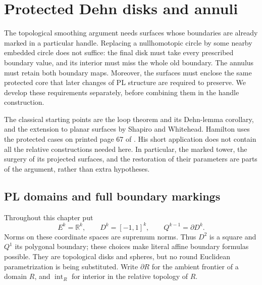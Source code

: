 \chapter{Protected Dehn disks and annuli}
\label{ch:dehn-surfaces}

The topological smoothing argument needs surfaces whose boundaries are
already marked in a particular handle.  Replacing a nullhomotopic circle
by some nearby embedded circle does not suffice: the final disk must take
every prescribed boundary value, and its interior must miss the whole old
boundary.  The annulus must retain both boundary maps.  Moreover, the
surfaces must enclose the same protected core that later changes of PL
structure are required to preserve.  We develop these requirements
separately, before combining them in the handle construction.

The classical starting points are the loop theorem and its Dehn-lemma
corollary, and the extension to planar surfaces by Shapiro and Whitehead.
Hamilton uses the protected cases on printed page 67 of
\cite{Hamilton1976}.  His short application does not contain all the
relative constructions needed here.  In particular, the marked tower,
the surgery of its projected surfaces, and the restoration of their
parameters are parts of the argument, rather than extra hypotheses.

\section{PL domains and full boundary markings}
\label{sec:dehn-domains}

Throughout this chapter put
\[
 E^k=\mathbb R^k,\qquad
 D^k=[-1,1]^k,\qquad Q^{k-1}=\partial D^k.
\]
Norms on these coordinate spaces are supremum norms.  Thus $D^2$ is a
square and $Q^1$ its polygonal boundary; these choices make literal
affine boundary formulas possible.  They are topological disks and
spheres, but no round Euclidean parametrization is being substituted.
Write $\partial R$ for the ambient frontier of a domain $R$, and
$\operatorname{int}_R$ for interior in the relative topology of $R$.

